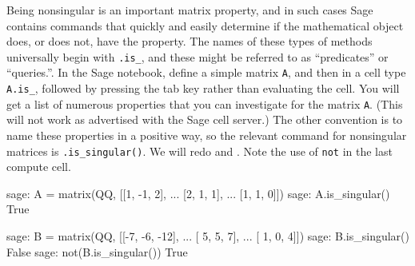 Being nonsingular is an important matrix property, and in such cases Sage contains commands that quickly and easily determine if the mathematical object does, or does not, have the property.  The names of these types of methods universally begin with \verb?.is_?, and these might be referred to as ``predicates'' or ``queries.''.  In the Sage notebook, define a simple matrix \verb?A?, and then in a cell type \verb?A.is_?, followed by pressing the tab key rather than evaluating the cell.  You will get a list of numerous properties that you can investigate for the matrix \verb?A?.  (This will not work as advertised with the Sage cell server.)
%
The other convention is to name these properties in a positive way, so the relevant command for nonsingular matrices is \verb?.is_singular()?.  We will redo  and .  Note the use of \verb!not! in the last compute cell.
%
\begin{sageexample}
sage: A = matrix(QQ, [[1, -1, 2],
...                   [2,  1, 1],
...                   [1,  1, 0]])
sage: A.is_singular()
True
\end{sageexample}
%
\begin{sageexample}
sage: B = matrix(QQ, [[-7, -6, -12],
...                   [ 5,  5,   7],
...                   [ 1,  0,   4]])
sage: B.is_singular()
False
sage: not(B.is_singular())
True
\end{sageexample}
%
\begin{sageverbatim}
\end{sageverbatim}
%
